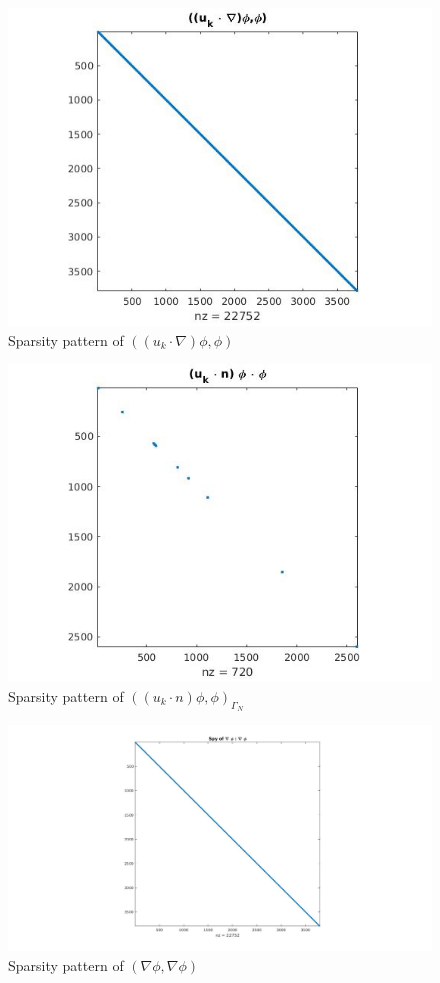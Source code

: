 \documentclass[a4paper]{book}
\begin{document}
\begin{figure}[H]
\centering
  \includegraphics[width=\linewidth]{figure6.jpg}
  \caption{Sparsity pattern of $((u_k \cdot \nabla)\phi,\phi)$}
  \label{figure_6}
\end{figure}
\begin{figure}[H]
\centering
  \includegraphics[width=\linewidth]{figure7.jpg}
  \caption{Sparsity pattern of $((u_k \cdot n)\phi,\phi)_{\Gamma_N}$}
  \label{figure_7}
\end{figure}
\begin{figure}[H]
\centering
  \includegraphics[width=\linewidth]{figure1.jpg}
  \caption{Sparsity pattern of $(\nabla \phi,\nabla \phi)$}
  \label{fig:sparsity_del_phi_del_phi}
\end{figure}
\end{document}
